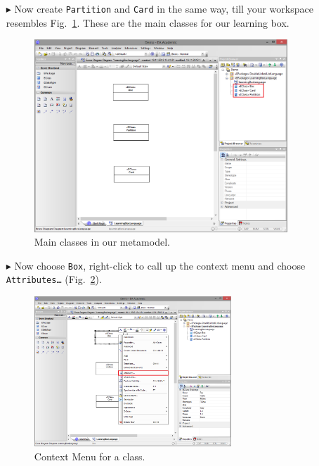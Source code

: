 \begin{enumerate}
\item[$\blacktriangleright$] Now create \texttt{Partition} and \texttt{Card} in the same way, till your workspace resembles Fig.~\ref{fig:all_eclasses}.
These are the main classes for our learning box.

\begin{figure}[htbp]
	\centering
  \includegraphics[width=0.9\textwidth]{pics/memBoxBilder/memBox10.png}
	\caption{Main classes in our metamodel.}
	\label{fig:all_eclasses}
\end{figure}

\item[$\blacktriangleright$] Now choose \texttt{Box}, right-click to call up the context menu and choose \texttt{Att\-ri\-butes\ldots} (Fig.~\ref{fig:attribute}).

\begin{figure}[htbp]
	\centering
  \includegraphics[width=0.7\textwidth]{pics/memBoxBilder/memBox11.png}
	\caption{Context Menu for a class.}
	\label{fig:attribute}
\end{figure}



\end{enumerate}
